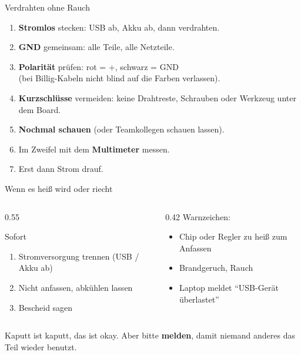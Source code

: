 \documentclass[10pt]{beamer}
\begin{document}
\begin{frame}{Verdrahten ohne Rauch}
  \begin{enumerate}
    \item \textbf{Stromlos} stecken: USB ab, Akku ab, dann verdrahten.
    \item \textbf{GND} gemeinsam: alle Teile, alle Netzteile.
    \item \textbf{Polarität} prüfen: \textcolor{fsitred}{rot = +}, schwarz = GND\\
          (bei Billig-Kabeln nicht blind auf die Farben verlassen).
    \item \textbf{Kurzschlüsse} vermeiden: keine Drahtreste, Schrauben oder
          Werkzeug unter dem Board.
    \item \textbf{Nochmal schauen} (oder Teamkollegen schauen lassen).
    \item Im Zweifel mit dem \textbf{Multimeter} messen.
    \item Erst dann Strom drauf.
  \end{enumerate}
\end{frame}

\begin{frame}{Wenn es heiß wird oder riecht}
  \begin{columns}[c]
    \begin{column}{0.55\textwidth}
      \begin{alertblock}{Sofort}
        \begin{enumerate}
          \item Stromversorgung trennen (USB / Akku ab)
          \item Nicht anfassen, abkühlen lassen
          \item Bescheid sagen
        \end{enumerate}
      \end{alertblock}
    \end{column}
    \begin{column}{0.42\textwidth}
      Warnzeichen:
      \begin{itemize}
        \item Chip oder Regler zu heiß zum Anfassen
        \item Brandgeruch, Rauch
        \item Laptop meldet \enquote{USB-Gerät überlastet}
      \end{itemize}
    \end{column}
  \end{columns}
  \vspace{1em}
  Kaputt ist kaputt, das ist okay. Aber bitte \textbf{melden}, damit niemand
  anderes das Teil wieder benutzt.
\end{frame}
\end{document}
